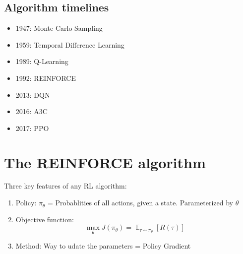 \documentclass[]{article}
\newcommand{\rowspace}[1]{\renewcommand{\arraystretch}{#1}}
\begin{document}
%		
\newpage
\subsection{Algorithm timelines}
\begin{itemize}
	\item 1947: Monte Carlo Sampling
	\item 1959: Temporal Difference Learning
	\item 1989: Q-Learning
	\item 1992: REINFORCE
	\item 2013: DQN
	\item 2016: A3C
	\item 2017: PPO 
\end{itemize}

\section{The REINFORCE algorithm}
Three key features of any RL algorithm:
\begin{enumerate}
	\item Policy: $\pi_\theta$ = Probablities of all actions, given a state. Parameterized by $\theta$
	\item Objective function:
	\begin{equation}
		\max_{\theta} J(\pi_{\theta}) = \mathop{\mathbb{E}}_{\tau \sim \pi_\theta} [R(\tau)]
	\end{equation}
	\item Method: Way to udate the parameters = Policy Gradient

\end{enumerate}
\end{document}
